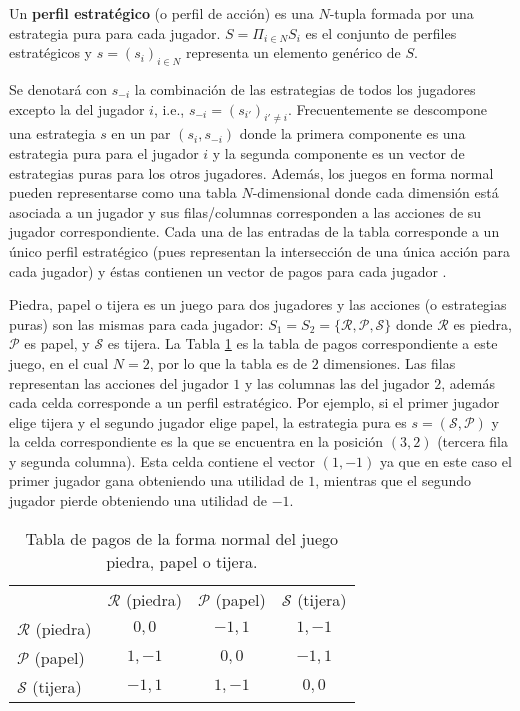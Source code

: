 \begin{definition} Un \textbf{perfil estratégico} (o perfil de acción) es una $N$-tupla formada por una estrategia pura para cada jugador. $S = \Pi_{i \in N}S_i$ es el conjunto de perfiles estratégicos y $s = (s_i)_{i \in N}$ representa un elemento genérico de $S$.  
\end{definition}

Se denotará con $s_{-i}$ la combinación de las estrategias de todos los jugadores excepto la del jugador $i$, i.e., $s_{-i} = (s_{i'})_{i' \neq i}$. Frecuentemente se descompone una estrategia $s$ en un par $(s_i,s_{-i})$ donde la primera componente es una estrategia pura para el jugador $i$ y la segunda componente es un vector de estrategias puras para los otros jugadores. Además, los juegos en forma normal pueden representarse como una tabla $N$-dimensional donde cada dimensión está asociada a un jugador y sus filas/columnas corresponden a las acciones de su jugador correspondiente. Cada una de las entradas de la tabla corresponde a un único perfil estratégico (pues representan la intersección de una única acción para cada jugador) y éstas contienen un vector de pagos para cada jugador \cite{bib:introductionCFR}.

Piedra, papel o tijera es un juego para dos jugadores y las acciones (o estrategias puras) son las mismas para cada jugador: $S_1 = S_2 = \{\mathcal{R}, \mathcal{P}, \mathcal{S} \}$ donde $\mathcal{R}$ es piedra, $\mathcal{P}$ es papel, y $\mathcal{S}$ es tijera. La Tabla \ref{table:pago-RPS} es la tabla de pagos correspondiente a este juego, en el cual $N = 2$, por lo que la tabla es de $2$ dimensiones. Las filas representan las acciones del jugador $1$ y las columnas las del jugador $2$, además cada celda corresponde a un perfil estratégico. Por ejemplo, si el primer jugador elige tijera y el segundo jugador elige papel, la estrategia pura es $s = (\mathcal{S}, \mathcal{P})$ y la celda correspondiente es la que se encuentra en la posición $(3, 2)$ (tercera fila y segunda columna). Esta celda contiene el vector $(1, -1)$ ya que en este caso el primer jugador gana obteniendo una utilidad de $1$, mientras que el segundo jugador pierde obteniendo una utilidad de $-1$.

\begin{table}[h]
\begin{center}
\caption{Tabla de pagos de la forma normal del juego piedra, papel o tijera.}
\label{table:pago-RPS}
\begin{tabular}{l |c | c | c |}
  \multicolumn{1}{c}{} & \multicolumn{1}{c}{$\mathcal{R}$ (piedra)} & \multicolumn{1}{c}{$\mathcal{P}$ (papel)} & \multicolumn{1}{c}{$\mathcal{S}$ (tijera)} \\ \cline{2-4}
$\mathcal{R}$ (piedra) & $0,0$ & $-1,1$ & $1,-1$ \\ \cline{2-4}
$\mathcal{P}$ (papel) & $1,-1$ & $0,0$ & $-1,1$ \\ \cline{2-4}
$\mathcal{S}$ (tijera) & $-1,1$ & $1,-1$ & $0,0$ \\ \cline{2-4}
\end{tabular}
\end{center}
\end{table}

